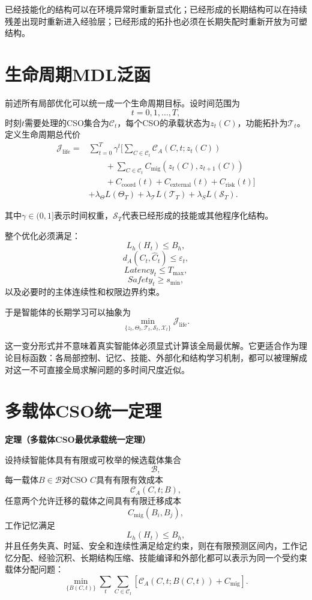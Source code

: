 已经技能化的结构可以在环境异常时重新显式化；已经形成的长期结构可以在持续残差出现时重新进入经验层；已经形成的拓扑也必须在长期失配时重新开放为可塑结构。

\section{生命周期MDL泛函}

前述所有局部优化可以统一成一个生命周期目标。设时间范围为
\[
t=0,1,\ldots,T,
\]
时刻$t$需要处理的CSO集合为$\mathcal C_t$，每个CSO的承载状态为$z_t(C)$，功能拓扑为$\mathcal T_t$。定义生命周期总代价
\[
\boxed{
\begin{aligned}
\mathcal J_{\mathrm{life}}
=&
\sum_{t=0}^{T}
\gamma^t
\Bigg[
\sum_{C\in\mathcal C_t}
\mathscr C_A
\left(
C,t;z_t(C)
\right)
\\
&\qquad
+
\sum_{C\in\mathcal C_t}
C_{\mathrm{mig}}
\left(
z_t(C),z_{t+1}(C)
\right)
\\
&\qquad
+
C_{\mathrm{coord}}(t)
+
C_{\mathrm{external}}(t)
+
C_{\mathrm{risk}}(t)
\Bigg]
\\
&
+
\lambda_\Theta L(\Theta_T)
+
\lambda_{\mathcal T}L(\mathcal T_T)
+
\lambda_S L(\mathcal S_T).
\end{aligned}
}
\]

其中$\gamma\in(0,1]$表示时间权重，$\mathcal S_T$代表已经形成的技能或其他程序化结构。

整个优化必须满足：
\[
L_h(H_t)
\leq
B_h,
\]
\[
d_A(C_t,\hat C_t)
\leq
\varepsilon_t,
\]
\[
Latency_t
\leq
T_{\max},
\]
\[
Safety_t
\geq
s_{\min},
\]
以及必要时的主体连续性和权限边界约束。

于是智能体的长期学习可以抽象为
\[
\boxed{
\min_{\{
z_t,
\Theta_t,
\mathcal T_t,
\mathcal S_t,
\mathcal X_t
\}}
\mathcal J_{\mathrm{life}}.
}
\]

这一变分形式并不意味着真实智能体必须显式计算该全局最优解。它更适合作为理论目标函数：各局部控制、记忆、技能、外部化和结构学习机制，都可以被理解成对这一不可直接全局求解问题的多时间尺度近似。

\section{多载体CSO统一定理}

\textbf{定理（多载体CSO最优承载统一定理）}

设持续智能体具有有限或可枚举的候选载体集合
\[
\mathcal B,
\]
每一载体$B\in\mathcal B$对CSO $C$具有有限有效成本
\[
\mathscr C_A(C,t;B),
\]
任意两个允许迁移的载体之间具有有限迁移成本
\[
C_{\mathrm{mig}}(B_i,B_j),
\]
工作记忆满足
\[
L_h(H_t)\leq B_h,
\]
并且任务失真、时延、安全和连续性满足给定约束，则在有限预测区间内，工作记忆分配、经验沉积、长期结构压缩、技能编译和外部化都可以表示为同一个受约束载体分配问题：
\[
\boxed{
\min_{\{B(C,t)\}}
\sum_t
\sum_{C\in\mathcal C_t}
\left[
\mathscr C_A
(C,t;B(C,t))
+
C_{\mathrm{mig}}
\right].
}
\]

